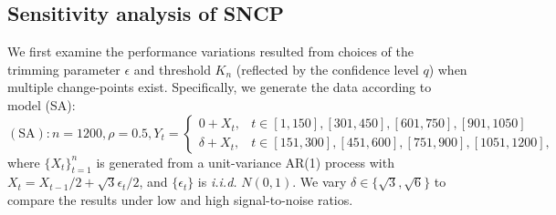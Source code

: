 \subsection{{Sensitivity analysis of SNCP}}\label{subsec:execution-time}



{We first examine the performance variations resulted from choices of the trimming parameter $\epsilon$ and threshold $K_n$ (reflected by the confidence level $q$) when multiple change-points exist. Specifically, we generate the data according to model (SA):
$$
(\mathrm{SA}): n=1200, \rho=0.5,  Y_t= \begin{cases}
0+X_t, & t \in  [1, 150], [301, 450], [601, 750], [901, 1050]
\\ \delta+X_t, & t \in  [151, 300], [451, 600], [751, 900], [1051, 1200],
\end{cases}
$$
where $\{X_t\}_{t=1}^n$ is generated from a unit-variance  AR(1) process with $X_t=  X_{t-1}/2+\sqrt{3}\epsilon_t/2$, and $\{\epsilon_t\}$ is \textit{i.i.d.} $N(0,1)$. We vary $\delta\in\{\sqrt{3},\sqrt{6}\}$ to compare the results under low and high signal-to-noise ratios.  } 

